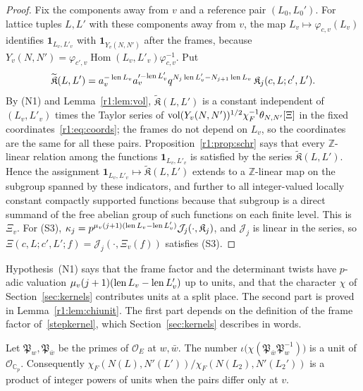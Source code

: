 \begin{proof}
Fix the components away from $v$ and a reference pair $(L_0,L_0')$. For lattice tuples $L,L'$ with these components away from $v$, the map $L_v\mapsto\varphi_{c,v}(L_v)$ identifies $\mathbf 1_{L_v,L'_v}$ with $\mathbf 1_{Y_v(N,N')}$ after the frames, because $Y_v(N,N')=\varphi_{c',v}\operatorname{Hom}(L_v,L'_v)\varphi_{c,v}^{-1}$. Put
\[
\widetilde{\mathfrak K}(L,L')=a_v^{-\operatorname{len} L_v}a_v'^{-\operatorname{len} L'_v}q^{N_j\operatorname{len} L'_v-N_{j+1}\operatorname{len} L_v}\,\mathfrak K_j(c,L;c',L').
\]
By (N1) and Lemma~\ref{r1:lem:vol}, $\widetilde{\mathfrak K}(L,L')$ is a constant independent of $(L_v,L'_v)$ times the Taylor series of $\operatorname{vol}(Y_v(N,N'))^{1/2}\chi_F^{-1}\theta_{N,N'}[\Xi]$ in the fixed coordinates~\eqref{r1:eq:coords}; the frames do not depend on $L_v$, so the coordinates are the same for all these pairs. Proposition~\ref{r1:prop:schr} says that every $\mathbb Z$-linear relation among the functions $\mathbf 1_{L_v,L'_v}$ is satisfied by the series $\widetilde{\mathfrak K}(L,L')$. Hence the assignment $\mathbf 1_{L_v,L'_v}\mapsto\widetilde{\mathfrak K}(L,L')$ extends to a $\mathbb Z$-linear map on the subgroup spanned by these indicators, and further to all integer-valued locally constant compactly supported functions because that subgroup is a direct summand of the free abelian group of such functions on each finite level. This is $\Xi_v$. For (S3), $\kappa_j=p^{\mu_v(j+1)(\operatorname{len} L_v-\operatorname{len} L'_v)}\mathcal J_j(\cdot,\mathfrak K_j)$, and $\mathcal J_j$ is linear in the series, so $\Xi(c,L;c',L';f)=\mathcal J_j(\cdot,\Xi_v(f))$ satisfies (S3).
\end{proof}

\begin{remark}
Hypothesis~(N1) says that the frame factor and the determinant twists have $p$-adic valuation $\mu_v(j+1)(\operatorname{len} L_v-\operatorname{len} L'_v)$ up to units, and that the character $\chi$ of Section~\ref{sec:kernels} contributes units at a split place. The second part is proved in Lemma~\ref{r1:lem:chiunit}. The first part depends on the definition of the frame factor of~\eqref{stepkernel}, which Section~\ref{sec:kernels} describes in words.
\end{remark}

\begin{lemma}\label{r1:lem:chiunit}
Let $\mathfrak P_w,\mathfrak P_{\bar w}$ be the primes of $\mathcal O_E$ at $w,\bar w$. The number $\iota\big(\chi(\mathfrak P_{\bar w}\mathfrak P_w^{-1})\big)$ is a unit of $\mathcal O_{\mathbb C_p}$. Consequently $\chi_F(N(L),N'(L'))/\chi_F(N(L_2),N'(L_2'))$ is a product of integer powers of units when the pairs differ only at $v$.
\end{lemma}

